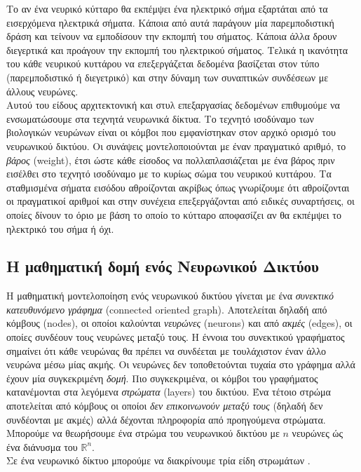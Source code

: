 \documentclass[11pt]{article} %
\numberwithin{equation}{subsection}
\begin{document}
Το αν ένα νευρικό κύτταρο θα εκπέμψει ένα ηλεκτρικό σήμα εξαρτάται από τα εισερχόμενα ηλεκτρικά σήματα. Κάποια από αυτά παράγουν μία παρεμποδιστική δράση και τείνουν να εμποδίσουν την εκπομπή του σήματος. Κάποια άλλα δρουν διεγερτικά και προάγουν την εκπομπή του ηλεκτρικού σήματος. Τελικά η ικανότητα του κάθε νευρικού κυττάρου να επεξεργάζεται δεδομένα βασίζεται στον τύπο (παρεμποδιστικό ή διεγετρικό) και στην δύναμη των συναπτικών συνδέσεων με άλλους νευρώνες.\\

Αυτού του είδους αρχιτεκτονική και στυλ επεξαργασίας δεδομένων επιθυμούμε να ενσωματώσουμε στα τεχνητά νευρωνικά δίκτυα. Το τεχνητό ισοδύναμο των βιολογικών νευρώνων είναι οι κόμβοι που εμφανίστηκαν στον αρχικό ορισμό του νευρωνικού δικτύου. Οι συνάψεις μοντελοποιούνται με έναν πραγματικό αριθμό, το \textit{βάρος} (weight), έτσι ώστε κάθε είσοδος να πολλαπλασιάζεται με ένα βάρος πριν εισέλθει στο τεχνητό ισοδύναμο με το κυρίως σώμα του νευρικού κυττάρου. Τα σταθμισμένα σήματα εισόδου αθροίζονται ακρίβως όπως γνωρίζουμε ότι αθροίζονται οι πραγματικοί αριθμοί και στην συνέχεια επεξεργάζονται από ειδικές συναρτήσεις, οι οποίες δίνουν το όριο με βάση το οποίο το κύτταρο αποφασίζει αν θα εκπέμψει το ηλεκτρικό του σήμα ή όχι.


\subsection{Η μαθηματική δομή ενός Νευρωνικού Δικτύου}


Η μαθηματική μοντελοποίηση ενός νευρωνικού δικτύου γίνεται με ένα \textit{συνεκτικό κατευθυνόμενο γράφημα} (connected oriented graph). Αποτελείται δηλαδή από κόμβους (nodes), οι οποίοι καλούνται \textit{νευρώνες} (neurons) και από \textit{ακμές} (edges), οι οποίες συνδέουν τους νευρώνες μεταξύ τους. Η έννοια του συνεκτικού γραφήματος σημαίνει ότι κάθε νευρώνας θα πρέπει να συνδέεται με τουλάχιστον έναν άλλο νευρώνα μέσω μίας ακμής. Οι νευρώνες δεν τοποθετούνται τυχαία στο γράφημα αλλά έχουν μία συγκεκριμένη \textit{δομή}. Πιο συγκεκριμένα, οι κόμβοι του γραφήματος κατανέμονται στα λεγόμενα \textit{στρώματα} (layers) του δικτύου. Ένα τέτοιο στρώμα αποτελείται από κόμβους οι οποίοι \textit{δεν επικοινωνούν μεταξύ τους} (δηλαδή δεν συνδέονται με ακμές) αλλά δέχονται πληροφορία από προηγούμενα στρώματα. Μπορούμε να θεωρήσουμε ένα στρώμα του νευρωνικού δικτύου με $n$ νευρώνες ώς ένα διάνυσμα του $\mathbb{R}^n$. \\
Σε ένα νευρωνικό δίκτυο μπορούμε να διακρίνουμε τρία είδη στρωμάτων \cite{neuralnets3}.\\
\end{document}
